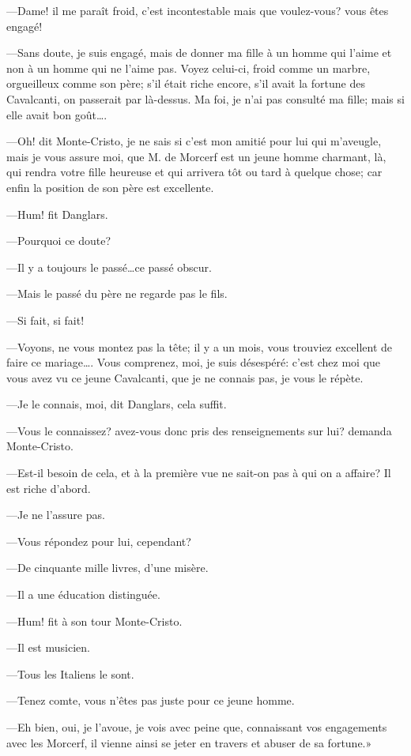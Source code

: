 —Dame! il me paraît froid, c'est incontestable mais que voulez-vous? vous êtes engagé! 

—Sans doute, je suis engagé, mais de donner ma fille à un homme qui l'aime et non à un homme qui ne l'aime pas. Voyez celui-ci, froid comme un marbre, orgueilleux comme son père; s'il était riche encore, s'il avait la fortune des Cavalcanti, on passerait par là-dessus. Ma foi, je n'ai pas consulté ma fille; mais si elle avait bon goût\dots. 

—Oh! dit Monte-Cristo, je ne sais si c'est mon amitié pour lui qui m'aveugle, mais je vous assure moi, que M. de Morcerf est un jeune homme charmant, là, qui rendra votre fille heureuse et qui arrivera tôt ou tard à quelque chose; car enfin la position de son père est excellente. 

—Hum! fit Danglars. 

—Pourquoi ce doute? 

—Il y a toujours le passé\dots ce passé obscur. 

—Mais le passé du père ne regarde pas le fils. 

—Si fait, si fait! 

—Voyons, ne vous montez pas la tête; il y a un mois, vous trouviez excellent de faire ce mariage\dots. Vous comprenez, moi, je suis désespéré: c'est chez moi que vous avez vu ce jeune Cavalcanti, que je ne connais pas, je vous le répète. 

—Je le connais, moi, dit Danglars, cela suffit. 

—Vous le connaissez? avez-vous donc pris des renseignements sur lui? demanda Monte-Cristo. 

—Est-il besoin de cela, et à la première vue ne sait-on pas à qui on a affaire? Il est riche d'abord. 

—Je ne l'assure pas. 

—Vous répondez pour lui, cependant? 

—De cinquante mille livres, d'une misère. 

—Il a une éducation distinguée. 

—Hum! fit à son tour Monte-Cristo. 

—Il est musicien. 

—Tous les Italiens le sont. 

—Tenez comte, vous n'êtes pas juste pour ce jeune homme. 

—Eh bien, oui, je l'avoue, je vois avec peine que, connaissant vos engagements avec les Morcerf, il vienne ainsi se jeter en travers et abuser de sa fortune.» 

